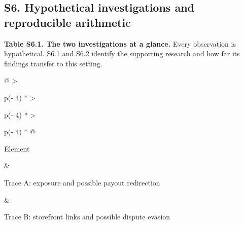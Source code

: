 \documentclass[
  11pt,
]{article}
\begin{document}
\clearpage

\hypertarget{s6.-hypothetical-investigations-and-reproducible-arithmetic}{%
\subsection{S6. Hypothetical investigations and reproducible
arithmetic}\label{s6.-hypothetical-investigations-and-reproducible-arithmetic}}

\suppressfloats[t]

\begin{table}[t]
\textbf{Table S6.1. The two investigations at a glance.} Every
observation is hypothetical. S6.1 and S6.2 identify the supporting
research and how far its findings transfer to this setting.\par\smallskip
{\small
\begin{tabular}{@{}
  >{\raggedright\arraybackslash}p{(\columnwidth - 4\tabcolsep) * }
  >{\raggedright\arraybackslash}p{(\columnwidth - 4\tabcolsep) * }
  >{\raggedright\arraybackslash}p{(\columnwidth - 4\tabcolsep) * }@{}}
\toprule\noalign{}
\begin{minipage}[b]{\linewidth}\raggedright
Element
\end{minipage} & \begin{minipage}[b]{\linewidth}\raggedright
Trace A: exposure and possible payout redirection
\end{minipage} & \begin{minipage}[b]{\linewidth}\raggedright
Trace B: storefront links and possible dispute evasion
\end{minipage} \\
\midrule\noalign{}


\end{tabular}}
\end{table}
\end{document}
